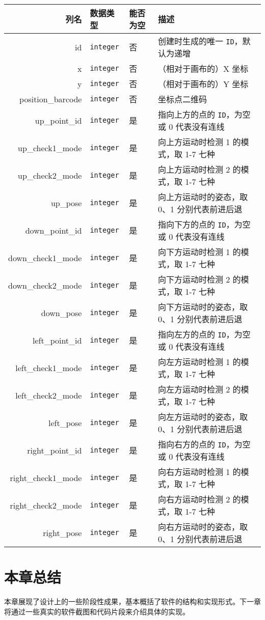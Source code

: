 \begin{longtabu}to \textwidth{rllX}
  \toprule
  列名 & 数据类型 & 能否为空 & 描述 \\
  \midrule
  \endhead
  \bottomrule
  \endfoot
  id & \texttt{integer} & 否 & 创建时生成的唯一 \texttt{ID}，默认为递增 \\
  x & \texttt{integer} & 否 & （相对于画布的）X 坐标 \\
  y & \texttt{integer} & 否 & （相对于画布的）Y 坐标 \\
  position\_barcode & \texttt{integer} & 否 & 坐标点二维码 \\
  up\_point\_id & \texttt{integer} & 是 & 指向上方的点的 \texttt{ID}，为空或 0 代表没有连线 \\
  up\_check1\_mode & \texttt{integer} & 是 & 向上方运动时检测 1 的模式，取 1-7 七种 \\
  up\_check2\_mode & \texttt{integer} & 是 & 向上方运动时检测 2 的模式，取 1-7 七种 \\
  up\_pose & \texttt{integer} & 是 & 向上方运动时的姿态，取 0、1 分别代表前进后退 \\
  down\_point\_id & \texttt{integer} & 是 & 指向下方的点的 \texttt{ID}，为空或 0 代表没有连线 \\
  down\_check1\_mode & \texttt{integer} & 是 & 向下方运动时检测 1 的模式，取 1-7 七种 \\
  down\_check2\_mode & \texttt{integer} & 是 & 向下方运动时检测 2 的模式，取 1-7 七种 \\
  down\_pose & \texttt{integer} & 是 & 向下方运动时的姿态，取 0、1 分别代表前进后退 \\
  left\_point\_id & \texttt{integer} & 是 & 指向左方的点的 \texttt{ID}，为空或 0 代表没有连线 \\
  left\_check1\_mode & \texttt{integer} & 是 & 向左方运动时检测 1 的模式，取 1-7 七种 \\
  left\_check2\_mode & \texttt{integer} & 是 & 向左方运动时检测 2 的模式，取 1-7 七种 \\
  left\_pose & \texttt{integer} & 是 & 向左方运动时的姿态，取 0、1 分别代表前进后退 \\
  right\_point\_id & \texttt{integer} & 是 & 指向右方的点的 \texttt{ID}，为空或 0 代表没有连线 \\
  right\_check1\_mode & \texttt{integer} & 是 & 向右方运动时检测 1 的模式，取 1-7 七种 \\
  right\_check2\_mode & \texttt{integer} & 是 & 向右方运动时检测 2 的模式，取 1-7 七种 \\
  right\_pose & \texttt{integer} & 是 & 向右方运动时的姿态，取 0、1 分别代表前进后退
\end{longtabu}

\section{本章总结}

本章展现了设计上的一些阶段性成果，基本概括了软件的结构和实现形式。下一章将通过一些真实的软件截图和代码片段来介绍具体的实现。
